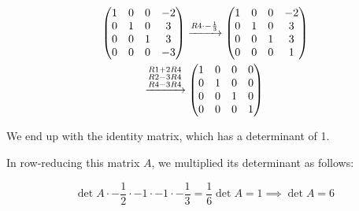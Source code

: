 \documentclass[12pt, a4paper]{article}
\begin{document}
\begin{gather*}
{\begin{subarray}{c}
        \end{subarray}
    }
    \begin{pmatrix}
        1 &  0 & 0 & -2\\
        0 &  1 & 0 & 3\\
        0 & 0 &  1 & 3\\
        0 & 0 &  0 & -3\\
    \end{pmatrix} \xrightarrow{R4 \cdot -\frac{1}{3}}
    \begin{pmatrix}
        1 &  0 & 0 & -2\\
        0 &  1 & 0 & 3\\
        0 & 0 &  1 & 3\\
        0 & 0 &  0 & 1\\
    \end{pmatrix} \\ \xrightarrow{
        \begin{subarray}{c}
            R1 + 2R4\\
            R2 - 3R4\\
            R4 - 3R4
        \end{subarray}
    }
    \begin{pmatrix}
        1 & 0 & 0 & 0\\
        0 & 1 & 0 & 0\\
        0 & 0 & 1 & 0\\
        0 & 0 & 0 & 1\\
    \end{pmatrix}
\end{gather*}

We end up with the identity matrix, which has a determinant of 1.

In row-reducing this matrix $A$, we multiplied its determinant as follows:

\[
    \det A \cdot -\frac{1}{2} \cdot -1 \cdot -1 \cdot -\frac{1}{3}
    = \frac{1}{6} \det A = 1 \implies \det A = 6
\]
\end{document}
